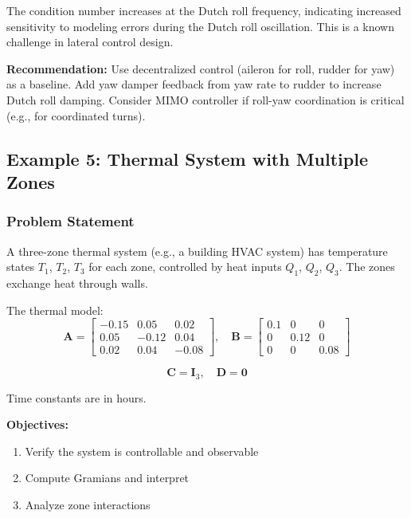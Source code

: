 The condition number increases at the Dutch roll frequency, indicating increased sensitivity to modeling errors during the Dutch roll oscillation. This is a known challenge in lateral control design.

\textbf{Recommendation:} Use decentralized control (aileron for roll, rudder for yaw) as a baseline. Add yaw damper feedback from yaw rate to rudder to increase Dutch roll damping. Consider MIMO controller if roll-yaw coordination is critical (e.g., for coordinated turns).


\subsection{Example 5: Thermal System with Multiple Zones}

\subsubsection{Problem Statement}

A three-zone thermal system (e.g., a building HVAC system) has temperature states $T_1$, $T_2$, $T_3$ for each zone, controlled by heat inputs $Q_1$, $Q_2$, $Q_3$. The zones exchange heat through walls.

The thermal model:
\begin{equation}
\mathbf{A} = \begin{bmatrix} -0.15 & 0.05 & 0.02 \\ 0.05 & -0.12 & 0.04 \\ 0.02 & 0.04 & -0.08 \end{bmatrix}, \quad
\mathbf{B} = \begin{bmatrix} 0.1 & 0 & 0 \\ 0 & 0.12 & 0 \\ 0 & 0 & 0.08 \end{bmatrix}
\end{equation}

\begin{equation}
\mathbf{C} = \mathbf{I}_3, \quad \mathbf{D} = \mathbf{0}
\end{equation}

Time constants are in hours.

\textbf{Objectives:}
\begin{enumerate}
\item Verify the system is controllable and observable
\item Compute Gramians and interpret
\item Analyze zone interactions
\end{enumerate}

